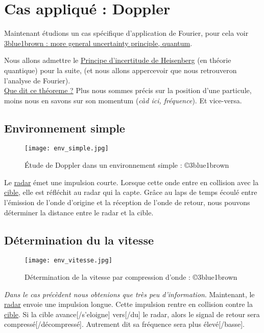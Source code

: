 \documentclass[a4paper]{book}
\begin{document}
\chapter{Cas appliqué : Doppler }

Maintenant étudions un cas spécifique d'application de Fourier, pour cela voir
\href{https://www.youtube.com/watch?v=MBnnXbOM5S4}{3blue1brown : more general 
uncertainty principle, quantum}. \\ \break

Nous allons admettre le \underline{Principe d'incertitude de Heisenberg} (en
théorie quantique) pour la suite, (et nous allons appercevoir que nous 
retrouveron l'analyse de Fourier).\\
\underline{Que dit ce théoreme ?} Plus nous sommes précis sur la position d'une
particule, moins nous en savons sur son momentum (\emph{càd ici, fréquence}).
Et vice-versa.

\section{Environnement simple}
\begin{figure}[htb!]
	\centering
	\texttt{[image: env\_simple.jpg]}
	\caption{Étude de Doppler dans un environnement
	simple : ©3blue1brown }
\end{figure}
Le \underline{radar} émet une impulsion courte. Lorsque cette onde entre en
collision avec la \underline{cible}, elle est réfléchit au radar qui la capte. 
Grâce au laps de temps écoulé entre l'émission de l'onde d'origine et la
réception de l'onde de retour, nous pouvons déterminer la distance entre le
radar et la cible.

\section{Détermination du la vitesse}
\begin{figure}[H]
	\centering
	\texttt{[image: env\_vitesse.jpg]}
	\caption{Détermination de la vitesse par compression d'onde
	: ©3blue1brown }
\end{figure}
\emph{Dans le cas précèdent nous obtenions que très peu d'information}.
Maintenant, le \underline{radar} envoie une impulsion longue. 
Cette impulsion rentre en collision contre la \underline{cible}. Si la cible
avance[/s'eloigne] vers[/du] le radar, alors le signal de retour sera 
compressé[/décompressé]. Autrement dit sa fréquence sera plus élevé[/basse]. \\
\end{document}
